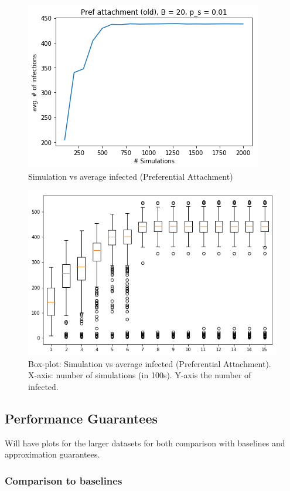 \begin{figure}[!h]
    \centering
    \includegraphics[scale = 0.6]{Figuresnew/simulations.png}
    \caption{Simulation vs average infected (Preferential Attachment)}
    \label{fig:pa_simvsavg}
\end{figure}
 
\begin{figure}[!h]
    \centering
    \includegraphics[scale = 0.4]{Figuresnew/boxplotpa.png}
    \caption{Box-plot: Simulation vs average infected (Preferential Attachment). X-axis: number of simulations (in 100s). Y-axis the number of infected.}
    \label{fig:pa_boxplot}
\end{figure}
\subsection{Performance Guarantees}
Will have plots for the larger datasets for both comparison with baselines and approximation guarantees.
\subsubsection{Comparison to baselines}
